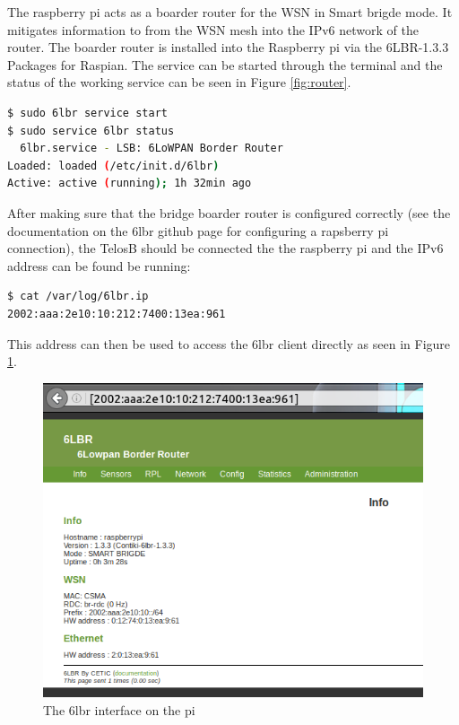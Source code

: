 The raspberry pi acts as a boarder router for the WSN in Smart brigde mode. It mitigates information to from the WSN mesh into the IPv6 network of the router. The boarder router is installed into the Raspberry pi via the 6LBR-1.3.3 Packages for Raspian. The service can be started through the terminal and the status of the working service can be seen in Figure \ref{fig:router}.

\begin{lstlisting}[language=bash,caption={Start the 6lbr service and check the status}]
$ sudo 6lbr service start
$ sudo service 6lbr status
  6lbr.service - LSB: 6LoWPAN Border Router
Loaded: loaded (/etc/init.d/6lbr)
Active: active (running); 1h 32min ago
\end{lstlisting}

After making sure that the bridge boarder router is configured correctly (see the documentation on the 6lbr github page for configuring a rapsberry pi connection), the TelosB should be connected the the raspberry pi and the IPv6 address can be found be running: 
 
\begin{lstlisting}[language=bash,caption={Get the TelosB node IPv6 address for accessing the 6lbr client}]
$ cat /var/log/6lbr.ip 
2002:aaa:2e10:10:212:7400:13ea:961
\end{lstlisting}

This address can then be used to access the 6lbr client directly as seen in Figure \ref{fig:interface}.

\begin{figure}[!h]
	\begin{center}
		\includegraphics[width=1\linewidth]{interface}
		\caption{The 6lbr interface on the pi}
		\label{fig:interface}
	\end{center}
\end{figure} 

